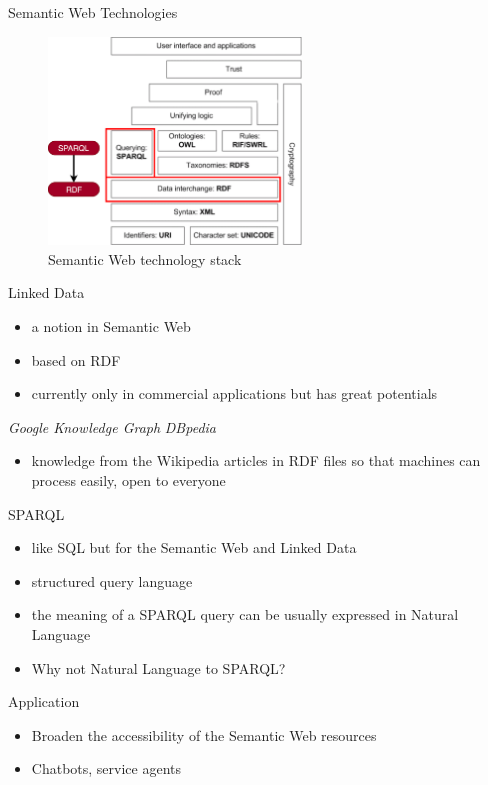 \documentclass[11pt]{beamer}
\begin{document}
\begin{frame}{Semantic Web Technologies}
    \begin{figure}[h]
    \includegraphics[width=0.6\textwidth]{Semantic-web-stack}
    \centering
    \caption{Semantic Web technology stack}
    \label{figure:semantic web stack}
    \end{figure}
\end{frame}

\begin{frame}{Linked Data}
    \begin{itemize}
        \item a notion in Semantic Web
        \item based on RDF 
        \item currently only in commercial applications but has great potentials
    \end{itemize}

    \begin{example}
        \textit{Google Knowledge Graph}
        \textit{DBpedia}
        \begin{itemize}
            \item knowledge from the Wikipedia articles in RDF files so that machines can process easily, open to everyone
        \end{itemize}
    \end{example}
\end{frame}

\begin{frame}{SPARQL}

    \begin{itemize}
        \item like SQL but for the Semantic Web and Linked Data
        \item structured query language
        \item the meaning of a SPARQL query can be usually expressed in Natural Language
        \item Why not Natural Language to SPARQL?
    \end{itemize}

    \begin{block}{Application}
        \begin{itemize}
            \item Broaden the accessibility of the Semantic Web resources
            \item Chatbots, service agents
        \end{itemize}
    \end{block}

\end{frame}
\end{document}
